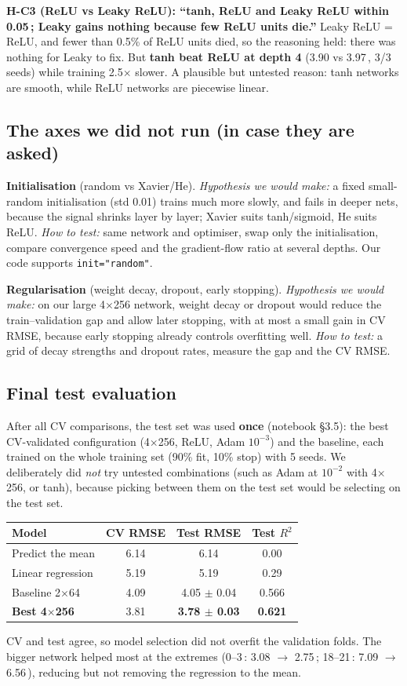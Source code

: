 \documentclass[11pt,a4paper]{article}
\newcommand{\A}{\,\text{\AA}}
\newcommand{\verdict}[1]{\fbox{\footnotesize\textbf{#1}}}
\begin{document}
\textbf{H-C3 (ReLU vs Leaky ReLU): ``tanh, ReLU and Leaky ReLU within 0.05\A; Leaky gains nothing because few ReLU units
die.''} \verdict{Partly supported}
Leaky ReLU = ReLU, and fewer than 0.5\% of ReLU units died, so the reasoning held: there was nothing for Leaky to fix.
But \textbf{tanh beat ReLU at depth 4} (3.90 vs 3.97\A, 3/3 seeds) while training 2.5$\times$ slower. A plausible but
untested reason: tanh networks are smooth, while ReLU networks are piecewise linear.

\subsection{The axes we did not run (in case they are asked)}
\textbf{Initialisation} (random vs Xavier/He). \emph{Hypothesis we would make:} a fixed small-random initialisation
(std 0.01) trains much more slowly, and fails in deeper nets, because the signal shrinks layer by layer; Xavier suits
tanh/sigmoid, He suits ReLU. \emph{How to test:} same network and optimiser, swap only the initialisation, compare
convergence speed and the gradient-flow ratio at several depths. Our code supports \texttt{init="random"}.

\textbf{Regularisation} (weight decay, dropout, early stopping). \emph{Hypothesis we would make:} on our large 4$\times$256
network, weight decay or dropout would reduce the train--validation gap and allow later stopping, with at most a small
gain in CV RMSE, because early stopping already controls overfitting well. \emph{How to test:} a grid of decay strengths
and dropout rates, measure the gap and the CV RMSE.

\subsection{Final test evaluation}
After all CV comparisons, the test set was used \textbf{once} (notebook \S3.5): the best CV-validated configuration
(4$\times$256, ReLU, Adam $10^{-3}$) and the baseline, each trained on the whole training set (90\% fit, 10\% stop) with
5 seeds. We deliberately did \emph{not} try untested combinations (such as Adam at $10^{-2}$ with 4$\times$256, or tanh),
because picking between them on the test set would be selecting on the test set.

\begin{center}
\small
\begin{tabular}{@{}lccc@{}}
\toprule
Model & CV RMSE & Test RMSE & Test $R^2$ \\
\midrule
Predict the mean & 6.14 & 6.14 & 0.00 \\
Linear regression & 5.19 & 5.19 & 0.29 \\
Baseline 2$\times$64 & 4.09 & 4.05 $\pm$ 0.04 & 0.566 \\
\textbf{Best 4$\times$256} & 3.81 & \textbf{3.78 $\pm$ 0.03} & \textbf{0.621} \\
\bottomrule
\end{tabular}
\end{center}
CV and test agree, so model selection did not overfit the validation folds. The bigger network helped most at the
extremes (0--3\A: 3.08 $\to$ 2.75\A; 18--21\A: 7.09 $\to$ 6.56\A), reducing but not removing the regression to the mean.
\end{document}
